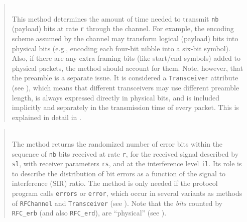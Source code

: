 \begin{quote}
\noindent{} \hspace{0in}\vspace{0.05in}\\
\noindent
This method determines the amount of time needed to transmit {\tt nb} (payload)
bits at rate {\tt r} through the channel.
For example, the encoding scheme assumed by the channel may transform
logical (payload) bits into physical bits (e.g., encoding each four-bit nibble
into a six-bit symbol).
Also, if there are any extra framing bits (like start/end symbols) added to
physical packets, the method should account for them.
Note, however, that the preamble is a separate issue.
It is considered a {\tt Transceiver} attribute (see ),
which means that different transceivers may use
different preamble length, is always expressed directly in physical bits,
and is included implicitly and
separately in the transmission time of every packet.
This is explained in detail in .
\end{quote}

\begin{quote}
\noindent{} \hspace{0in}\vspace{0.05in}\\
\noindent
The method returns the randomized number of error bits within the sequence of
{\tt nb} bits received at rate {\tt r}, for the received signal described by
{\tt sl}, with receiver parameters {\tt rs}, and at the interference
level {\tt il}.
Its role is to describe the distribution of bit errors as a function of the
signal to interference (SIR) ratio.
The method is only needed if the protocol program calls
{\tt errors} or {\tt error}, which occur in several variants as methods of
{\tt RFChannel} and {\tt Transceiver} (see ).
Note that the {\em bits\/} counted by {\tt RFC\_erb} (and also {\tt RFC\_erd}),
are ``physical'' (see ).
\end{quote}

